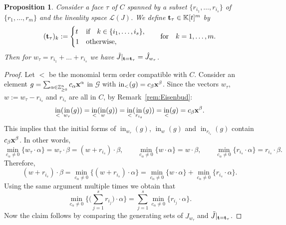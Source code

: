 \documentclass[10pt,a4paper]{amsart}
\newcommand{\thlabel}[1]{\label{#1}}
\newtheorem{Proposition}[Theorem]{Proposition}
\numberwithin{equation}{section}
\DeclareMathOperator{\init}{in}
\begin{document}
\begin{Proposition}\thlabel{prop:special fibers}
Consider a face $\tau$ of $C$ spanned by a subset $\{r_{i_1},\dots,r_{i_s}\}$ of $\{r_1,\dots,r_m\}$ and the lineality space $\mathcal L(J)$.
We define ${\bf t}_\tau\in \mathbb K[t]^{m}$ by
\begin{displaymath}
({\bf t}_\tau)_k:= \begin{cases}t& \text{if}\quad k\in\{i_1,\ldots,i_s\},
\\
1 &\text{otherwise,}
\end{cases}
\qquad
\text{for}
\quad k=1,\ldots,m.
\end{displaymath}
Then for $w_\tau=r_{i_1}+\dots +r_{i_s}$ we have $\tilde J\vert_{{\bf t}={\bf t}_\tau}=\hat J_{w_\tau}$.
\end{Proposition}
\begin{proof}
Let $<$ be the monomial term order compatible with $C$. Consider an element $g=\sum_{\alpha \in \mathbb Z^n_{\ge 0}}c_{\alpha}{\bf x}^{\alpha}$ in $\mathcal{G}$ with $\init_<(g)=c_\beta {\bf x}^\beta$. Since the vectors $w_\tau$, $w:=w_\tau-r_{i_s}$ and $r_{i_s}$ are all in $C$, by Remark~\ref{rem:Eisenbud}:
\begin{equation*}%
\init_<(\init_{w_\tau}(g))=\init_<(\init_{w}(g))=\init_{<}(\init_{r_{i_s}}(g))=\init_<(g)=c_\beta {\bf x}^\beta.
\end{equation*}
This implies that the initial forms of $\init_{w_\tau}(g)$, $\init_{w}(g)$ and $\init_{r_{i_s}}(g)$ contain %
$c_\beta {\bf x}^\beta$. In other words,
\begin{displaymath}
\min_{c_{\alpha}\not =0}\{w_\tau\cdot \alpha\}=w_\tau\cdot\beta=(w+r_{i_s})\cdot \beta, \qquad \min_{c_{\alpha}\not =0}\{w\cdot \alpha\}=w\cdot\beta,\qquad \min_{c_{\alpha}\not =0}\{r_{i_s}\cdot \alpha\}=r_{i_s}\cdot\beta.
\end{displaymath}
Therefore,
\begin{displaymath}
(w+r_{i_s})\cdot\beta=\min_{c_{\alpha}\not =0}\{(w+r_{i_s})\cdot \alpha\} =\min_{ c_{\alpha}\not =0}\{w\cdot \alpha\} + \min_{c_{\alpha}\not =0} \{r_{i_s}\cdot \alpha\}.
\end{displaymath}
Using the same argument multiple times we obtain that
\begin{displaymath}
\min_{c_{\alpha}\not =0}\Bigg\{ \bigg(\sum_{j=1}^s r_{i_j}\bigg)\cdot \alpha \Bigg\} = \sum_{j=1}^s \min_{c_{\alpha}\not =0}\{r_{i_j}\cdot \alpha\}.
\end{displaymath}
Now the claim follows by comparing the generating sets of $\hat J_{w_\tau}$ and $\tilde J\vert_{{\bf t}={\bf t}_{\tau}}$.
\end{proof}
\end{document}

